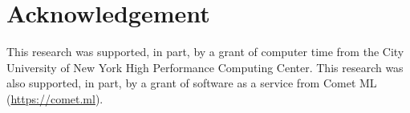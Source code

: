 \section*{Acknowledgement}
This research was supported, in part, by a grant of computer time from the City
University of New York High Performance Computing Center.
This research was also supported, in part, by a grant of software as a service
from Comet ML (\url{https://comet.ml}).

